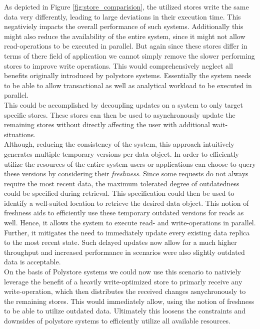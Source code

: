 As depicted in Figure \ref{fig:store_comparision}, the utilized stores write the same data very differently, leading to large deviations in their execution time. 
This negativiely impacts the overall performance of such systems.
Additionally this might also reduce the availability of the entire system, since it might not allow read-operations to be executed in parallel. 
But again since these stores differ in terms of there field of application we cannot simply remove the slower performing stores to improve write operations. 
This would comprehensively neglect all benefits originally introduced by polystore systems.
Essentially the system needs to be able to allow transactional as well as analytical workload to be executed in parallel.\\
This could be accomplished by decoupling updates on a system to only target specific stores. 
These stores can then be used to asynchronously update
the remaining stores without directly affecting the user with additional wait-situations.\\
Although, reducing the consistency of the system, this approach intuitively generates multiple temporary versions per data object.
In order to efficiently utilize the resources of the entire system users or applications can choose to query these versions by
considering their \emph{freshness}.
Since some requests do not always require the most recent data, the maximum tolerated degree of outdatedness could be specified during retrieval.
This specification could then be used to identify a well-suited location to retrieve the desired data object. 
This notion of freshness aids to efficiently use these temporary outdated versions for reads as well. 
Hence, it allows the system to execute read- and write-operations in parallel.
Further, it mitigates the need to immediately update every existing data replica to the most recent state.
Such delayed updates now allow for a much higher throughput and increased performance in scenarios were also slightly 
outdated data is acceptable.\\
On the basis of Polystore systems we could now use this scenario to nativiely leverage the benefit of a heavily write-optimized store to 
primarly receive any write-operation, which then distributes the received changes asnychronously to the remaining stores. This
would immediately allow, using the notion of freshness to be able to utilize outdated data.
Ultimately this loosens the constraints and downsides of polystore systems to efficiently utilize all available resources.



